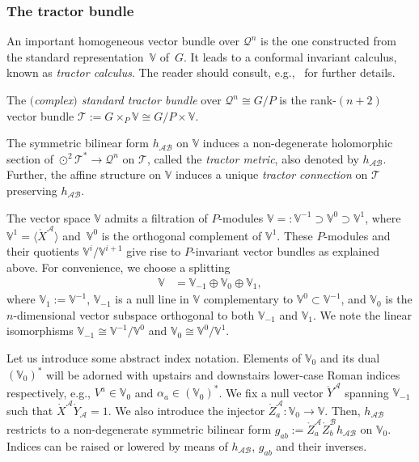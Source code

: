 \documentclass[10pt,a4paper]{amsart}
\numberwithin{equation}{section}
\newcommand{\mc} [1]{\mathcal{#1}}
\newcommand{\mr}[1] {\mathring{#1}}
\newcommand{\V} {\mathbb{V}}
\begin{document}
\subsubsection{The tractor bundle}\label{sec-tractor}
An important homogeneous vector bundle over $\mc{Q}^n$ is the one constructed from the standard representation~$\V$ of~$G$. It leads to a conformal invariant calculus, known as \emph{tractor calculus}. The reader should consult, e.g.,~\cite{Bailey1994,Curry2014} for further details.

\begin{Definition}
The \emph{$($complex$)$ standard tractor bundle} over $\mc{Q}^n \cong G/P$ is the rank-$(n+2)$ vector bundle $\mc{T} := G \times_P \V \cong G/P \times \V$.
\end{Definition}
The symmetric bilinear form $h_{\mc{A} \mc{B}}$ on $\V$ induces a non-degenerate holomorphic section of $\odot^2 \mc{T}^* \rightarrow \mc{Q}^n$ on $\mc{T}$, called the \emph{tractor metric}, also denoted by $h_{\mc{A} \mc{B}}$. Further, the af\/f\/ine structure on $\V$ induces a unique \emph{tractor connection} on $\mc{T}$ preserving $h_{\mc{A} \mc{B}}$.

The vector space $\V$ admits a f\/iltration of $P$-modules $\V =: \V^{-1} \supset \V^0 \supset \V^1$, where $\V^1 = \big\langle \mr{X}^\mc{A} \big\rangle$ and~$\V^0$ is the orthogonal complement of $\V^1$. These $P$-modules and their quotients $\V^i/\V^{i+1}$ give rise to $P$-invariant vector bundles as explained above. For convenience, we choose a splitting
\begin{align}\label{eq-split-V}
\V & = \V_{-1} \oplus \V_0 \oplus \V_1 ,
\end{align}
where $\V_1 :=\V^{-1}$, $\V_{-1}$ is a null line in $\V$ complementary to $\V^0 \subset \V^{-1}$, and $\V_0$ is the $n$-dimensional vector subspace orthogonal to both $\V_{-1}$ and $\V_1$. We note the linear isomorphisms $\V_{-1} \cong \V^{-1}/\V^0$ and $\V_0 \cong \V^0/\V^1$.

 Let us introduce some abstract index notation. Elements of $\V_0$ and its dual $(\V_0)^*$ will be adorned with upstairs and downstairs lower-case Roman indices respectively, e.g., $V^a \in \V_0$ and $\alpha_a \in (\V_0)^*$. We f\/ix a null vector $\mr{Y}^\mc{A}$ spanning $\V_{-1}$ such that $\mr{X}^\mc{A} \mr{Y}_\mc{A} =1$. We also introduce the injector $\mr{Z}^\mc{A}_a \colon \V_0 \rightarrow \V$. Then, $h_{\mc{A} \mc{B}}$ restricts to a non-degenerate symmetric bilinear form $g_{ab} := \mr{Z}^\mc{A}_a \mr{Z}^\mc{B}_b h_{\mc{A} \mc{B}}$ on $\V_0$. Indices can be raised or lowered by means of $h_{\mc{A} \mc{B}}$, $g_{ab}$ and their inverses.
\end{document}
